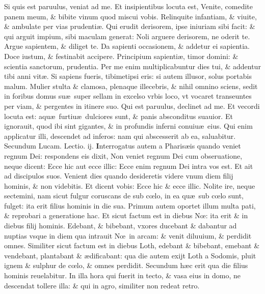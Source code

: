 \documentclass[a5paper,10pt]{book}
\def\leftmarginnote{%
	\lrmarginnote{\hskip -\marginparsep \hskip -6.5em}}
\def\ae{æ}
\def\oe{œ}
\begin{document}
\begin{multicols*}{2}
Si quis est paruulus, veniat ad me. Et insipientibus locuta est, Venite, comedite panem meum, \& bibite vinum quod miscui vobis.
Relinquite infantiam, \& viuite, \& ambulate per vias prudenti\ae . Qui erudit derisorem, ipse iniuriam sibi facit: \& qui arguit impium, sibi maculam generat: Noli arguere derisorem, ne oderit te. Argue sapientem, \& diliget te.
Da sapienti occasionem, \& addetur ei sapientia. Doce iustum, \& festinabit accipere. Principium sapienti\ae , timor domini: \& scientia sanctorum, prudentia.
Per me enim multiplicabuntur dies tui, \& addentur tibi anni vit\ae . Si sapiens fueris, tibimetipsi eris: si autem illusor, solus portabis malum.
Mulier stulta \& clamosa, plenaque illecebris, \& nihil omnino sciens, sedit in foribus domus su\ae \ super sellam in excelso vrbis loco, vt vocaret transeuntes per viam, \& pergentes in itinere suo.
Qui est paruulus, declinet ad me. Et vecordi locuta est: aqu\ae \ furtiu\ae \ dulciores sunt, \& panis absconditus suauior.
Et ignorauit, quod ibi sint gigantes, \& in profundis inferni conuiu\ae \ eius.
Qui enim applicatur illi, descendet ad inferos: nam qui abscesserit ab ea, saluabitur.%
\newline \color{red} Secundum Lucam. \hfill Lectio. ij. \color{black}
\vspace{-.25em}
\lettrine[lines=2]{\bfseries \color{red} I}{}nterrogatus\leftmarginnote{\begin{flushright}c. 17.\end{flushright}} autem a Pharis\ae is quando veniet regnum Dei: respondens eis dixit, Non veniet regnum Dei cum obseruatione, neque dicent: Ecce hic aut ecce illic: Ecce enim regnum Dei intra vos est.
Et ait ad discipulos suos. Venient dies quando desideretis videre vnum diem filij hominis, \& non videbitis. Et dicent vobis: Ecce hic \& ecce illic.
Nolite ire, neque sectemini, nam sicut fulgur coruscans de sub c\oe lo, in ea qu\ae \ sub c\oe lo sunt, fulget: ita erit filius hominis in die sua.
Primum autem oportet illum multa pati, \& reprobari a generatione hac.
Et sicut factum est in diebus N\oe : ita erit \& in diebus filij hominis. Edebant,
\& bibebant, vxores ducebant \& dabantur ad nuptias vsque in diem qua intrauit N\oe \ in arcam: \& venit diluuium, \& perdidit omnes.
Similiter sicut factum est in diebus Loth, edebant \& bibebant, emebant \& vendebant, plantabant \& \ae dificabant: qua die autem exijt Loth a Sodomis, pluit ignem \& sulphur de c\oe lo, \& omnes perdidit.
Secundum h\ae c erit qua die filius hominis reuelabitur.
In illa hora qui fuerit in tecto, \& vasa eius in domo, ne descendat tollere illa: \& qui in agro, similiter non redeat retro.

\end{multicols*}
\end{document}
